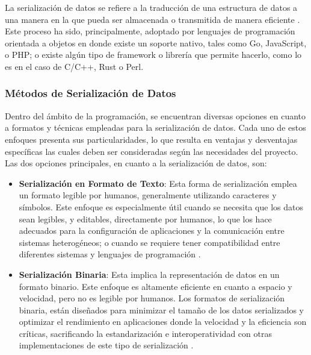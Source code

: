 La serialización de datos se refiere a la traducción de una estructura de datos a una manera en la que pueda ser almacenada o transmitida de manera eficiente \cite{mozillaSerialization}. Este proceso ha sido, principalmente, adoptado por lenguajes de programación orientada a objetos en donde existe un soporte nativo, tales como Go, JavaScript, o PHP; o existe algún tipo de framework o librería que permite hacerlo, como lo es en el caso de C/C++, Rust o Perl.

\subsubsection{Métodos de Serialización de Datos}

Dentro del ámbito de la programación, se encuentran diversas opciones en cuanto a formatos y técnicas empleadas para la serialización de datos. Cada uno de estos enfoques presenta sus particularidades, lo que resulta en ventajas y desventajas específicas las cuales deben ser consideradas según las necesidades del proyecto. Las dos opciones principales, en cuanto a la serialización de datos, son:

\begin{itemize}
    \item \textbf{Serialización en Formato de Texto}: Esta forma de serialización emplea un formato legible por humanos, generalmente utilizando caracteres y símbolos. Este enfoque es especialmente útil cuando se necesita que los datos sean legibles, y editables, directamente por humanos, lo que los hace adecuados para la configuración de aplicaciones y la comunicación entre sistemas heterogéneos; o cuando se requiere tener compatibilidad entre diferentes sistemas y lenguajes de programación \cite{Grochowski2019}.
    \item \textbf{Serialización Binaria}: Esta implica la representación de datos en un formato binario. Este enfoque es altamente eficiente en cuanto a espacio y velocidad, pero no es legible por humanos. Los formatos de serialización binaria, están diseñados para minimizar el tamaño de los datos serializados y optimizar el rendimiento en aplicaciones donde la velocidad y la eficiencia son críticas, sacrificando la estandarización e interoperatividad con otras implementaciones de este tipo de serialización \cite{Grochowski2019}.
\end{itemize}